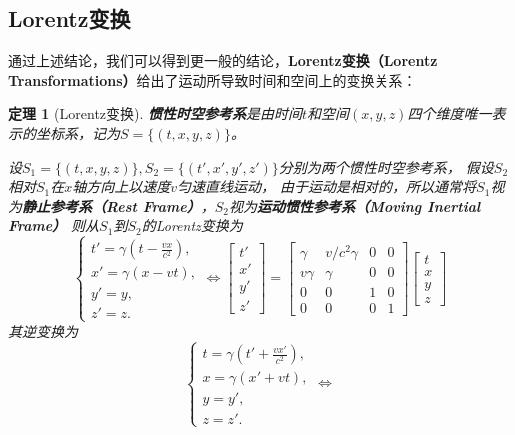 \documentclass[12pt, a4paper, oneside]{ctexart}
\newtheorem{theorem}{定理}[section] %
\numberwithin{equation}{section}  %
\begin{document}
\subsection{Lorentz变换}
通过上述结论，我们可以得到更一般的结论，\textbf{Lorentz变换（Lorentz Transformations）}给出了运动所导致时间和空间上的变换关系：
\begin{theorem}[Lorentz变换]
    \textbf{惯性时空参考系}是由时间$t$和空间$(x,y,z)$四个维度唯一表示的坐标系，记为$S=\{(t,x,y,z)\}$。

    设$S_1 = \{(t,x,y,z)\},S_2 = \{(t',x',y',z')\}$分别为两个惯性时空参考系，
    假设$S_2$相对$S_1$在$x$轴方向上以速度$v$匀速直线运动，
    由于运动是相对的，所以通常将$S_1$视为\textbf{静止参考系（Rest Frame）}，$S_2$视为\textbf{运动惯性参考系（Moving Inertial Frame）}
    则从$S_1$到$S_2$的Lorentz变换为
\begin{equation}\label{eq-Lorentz}
    \begin{cases}
        t' = \gamma\left(t - \frac{vx}{c^2}\right),\\
        x' = \gamma(x-vt),\\
        y' = y,\\
        z' = z.
    \end{cases}\iff
    \begin{bmatrix}
        t'\\x'\\y'\\z'
    \end{bmatrix} = \begin{bmatrix}
        \gamma&v/c^2\gamma&0&0\\
        v\gamma&\gamma&0&0\\
        0&0&1&0\\
        0&0&0&1
    \end{bmatrix}
    \begin{bmatrix}
        t\\x\\y\\z
    \end{bmatrix}
\end{equation}
其逆变换为
\begin{equation}\label{eq-Lorentz-inv}
    \begin{cases}
        t = \gamma\left(t' + \frac{vx'}{c^2}\right),\\
        x = \gamma(x'+vt),\\
        y = y',\\
        z = z'.
    \end{cases}\iff

\end{equation}
\end{theorem}
\end{document}
